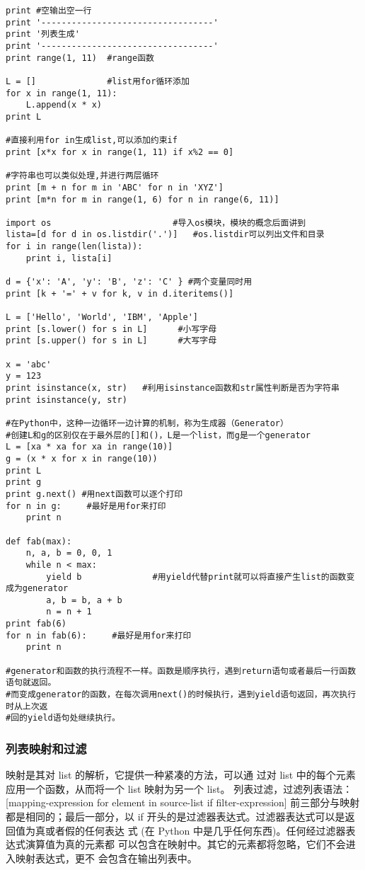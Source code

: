 \documentclass[twoside,11pt]{book}
\begin{document}
\begin{lstlisting}
print #空输出空一行
print '----------------------------------'
print '列表生成'
print '----------------------------------'
print range(1, 11)  #range函数

L = []              #list用for循环添加
for x in range(1, 11):
    L.append(x * x)
print L

#直接利用for in生成list,可以添加约束if
print [x*x for x in range(1, 11) if x%2 == 0]

#字符串也可以类似处理,并进行两层循环
print [m + n for m in 'ABC' for n in 'XYZ']
print [m*n for m in range(1, 6) for n in range(6, 11)]

import os                        #导入os模块，模块的概念后面讲到
lista=[d for d in os.listdir('.')]   #os.listdir可以列出文件和目录
for i in range(len(lista)):
    print i, lista[i]

d = {'x': 'A', 'y': 'B', 'z': 'C' } #两个变量同时用
print [k + '=' + v for k, v in d.iteritems()]

L = ['Hello', 'World', 'IBM', 'Apple']
print [s.lower() for s in L]      #小写字母
print [s.upper() for s in L]      #大写字母

x = 'abc'
y = 123
print isinstance(x, str)   #利用isinstance函数和str属性判断是否为字符串
print isinstance(y, str)

#在Python中，这种一边循环一边计算的机制，称为生成器（Generator）
#创建L和g的区别仅在于最外层的[]和()，L是一个list，而g是一个generator
L = [xa * xa for xa in range(10)]
g = (x * x for x in range(10))
print L
print g
print g.next() #用next函数可以逐个打印
for n in g:     #最好是用for来打印
    print n

def fab(max):
    n, a, b = 0, 0, 1
    while n < max:
        yield b              #用yield代替print就可以将直接产生list的函数变成为generator
        a, b = b, a + b
        n = n + 1
print fab(6)
for n in fab(6):     #最好是用for来打印
    print n

#generator和函数的执行流程不一样。函数是顺序执行，遇到return语句或者最后一行函数语句就返回。
#而变成generator的函数，在每次调用next()的时候执行，遇到yield语句返回，再次执行时从上次返
#回的yield语句处继续执行。
\end{lstlisting}

\subsubsection{列表映射和过滤}
映射是其对 list 的解析，它提供一种紧凑的方法，可以通 过对 list 中的每个元素应用一个函数，从而将一个 list 映射为另一个 list。
列表过滤，过滤列表语法：
[mapping-expression for element in source-list if filter-expression]
前三部分与映射都是相同的；最后一部分，以 if 开头的是过滤器表达式。过滤器表达式可以是返回值为真或者假的任何表达 式 (在 Python 中是几乎任何东西)。任何经过滤器表达式演算值为真的元素都 可以包含在映射中。其它的元素都将忽略，它们不会进入映射表达式，更不 会包含在输出列表中。
\end{document}
